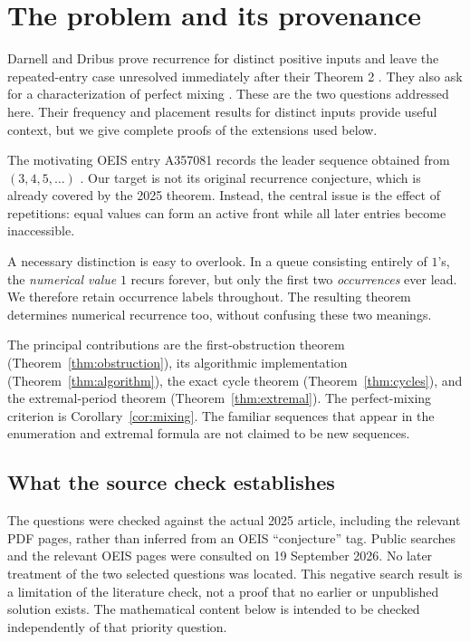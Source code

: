 \documentclass[11pt,letterpaper]{article}
\theoremstyle{definition}
\begin{document}
\section{The problem and its provenance}\label{sec:provenance}
Darnell and Dribus prove recurrence for distinct positive inputs and leave the
repeated-entry case unresolved immediately after their Theorem 2
\cite[p.~4]{DD}. They also ask for a characterization of perfect mixing
\cite[p.~16]{DD}. These are the two questions addressed here. Their frequency
and placement results for distinct inputs provide useful context, but we give
complete proofs of the extensions used below.

The motivating OEIS entry A357081 records the leader sequence obtained from
$(3,4,5,\ldots)$ \cite{A357081}. Our target is not its original recurrence
conjecture, which is already covered by the 2025 theorem. Instead, the
central issue is the effect of repetitions: equal values can form an active
front while all later entries become inaccessible.

A necessary distinction is easy to overlook. In a queue consisting entirely
of $1$'s, the \emph{numerical value} $1$ recurs forever, but only the first two
\emph{occurrences} ever lead. We therefore retain occurrence labels throughout.
The resulting theorem determines numerical recurrence too, without confusing
these two meanings.

The principal contributions are the first-obstruction theorem
(Theorem~\ref{thm:obstruction}), its algorithmic implementation
(Theorem~\ref{thm:algorithm}), the exact cycle theorem
(Theorem~\ref{thm:cycles}), and the extremal-period theorem
(Theorem~\ref{thm:extremal}). The perfect-mixing criterion is
Corollary~\ref{cor:mixing}. The familiar sequences that appear in the enumeration
and extremal formula are not claimed to be new sequences.

\subsection{What the source check establishes}
The questions were checked against the actual 2025 article, including the
relevant PDF pages, rather than inferred from an OEIS ``conjecture'' tag.
Public searches and the relevant OEIS pages were consulted on 19 September
2026. No later treatment of the two selected questions was located. This
negative search result is a limitation of the literature check, not a proof
that no earlier or unpublished solution exists. The mathematical content
below is intended to be checked independently of that priority question.
\end{document}

